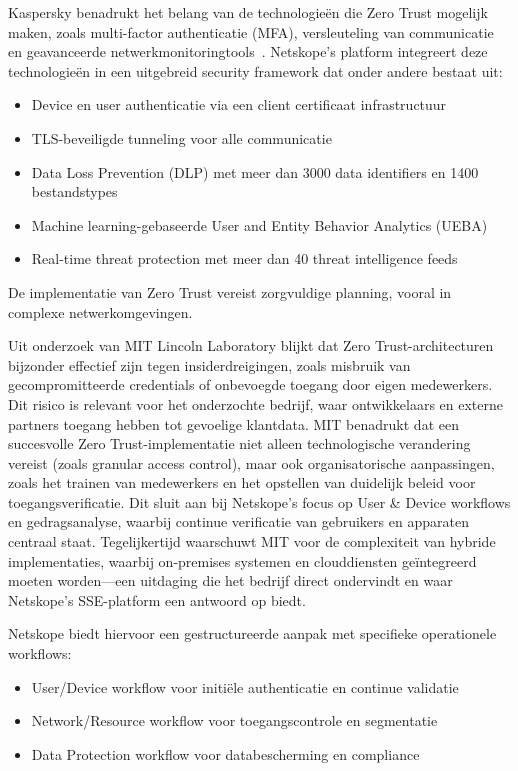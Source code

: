 Kaspersky benadrukt het belang van de technologieën die Zero Trust mogelijk maken, zoals multi-factor authenticatie (MFA), versleuteling van communicatie en geavanceerde netwerkmonitoringtools~\autocite{Kaspersky2024}. Netskope's platform integreert deze technologieën in een uitgebreid security framework dat onder andere bestaat uit:

\begin{itemize}
  \item Device en user authenticatie via een client certificaat infrastructuur
  \item TLS-beveiligde tunneling voor alle communicatie
  \item Data Loss Prevention (DLP) met meer dan 3000 data identifiers en 1400 bestandstypes
  \item Machine learning-gebaseerde User and Entity Behavior Analytics (UEBA)
  \item Real-time threat protection met meer dan 40 threat intelligence feeds
\end{itemize}

De implementatie van Zero Trust vereist zorgvuldige planning, vooral in complexe netwerkomgevingen.

Uit onderzoek van MIT Lincoln Laboratory blijkt dat Zero Trust-architecturen bijzonder effectief zijn tegen insiderdreigingen, zoals misbruik van gecompromitteerde credentials of onbevoegde toegang door eigen medewerkers. 
Dit risico is relevant voor het onderzochte bedrijf, waar ontwikkelaars en externe partners toegang hebben tot gevoelige klantdata. 
MIT benadrukt dat een succesvolle Zero Trust-implementatie niet alleen technologische verandering vereist (zoals granular access control), maar ook organisatorische aanpassingen, zoals het trainen van medewerkers en het opstellen van duidelijk beleid voor toegangsverificatie. 
Dit sluit aan bij Netskope’s focus op User \& Device workflows en gedragsanalyse, waarbij continue verificatie van gebruikers en apparaten centraal staat. 
Tegelijkertijd waarschuwt MIT voor de complexiteit van hybride implementaties, waarbij on-premises systemen en clouddiensten geïntegreerd moeten worden—een uitdaging die het bedrijf direct ondervindt en waar Netskope’s SSE-platform een antwoord op biedt.~\autocite{MIT2022}

Netskope biedt hiervoor een gestructureerde aanpak met specifieke operationele workflows:

\begin{itemize}
  \item User/Device workflow voor initiële authenticatie en continue validatie
  \item Network/Resource workflow voor toegangscontrole en segmentatie
  \item Data Protection workflow voor databescherming en compliance
\end{itemize}

